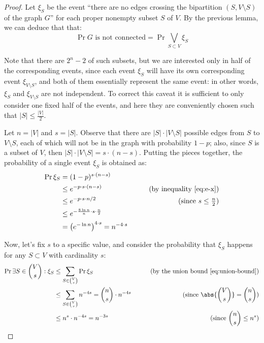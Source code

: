 \begin{proof}
    Let $\xi_S$ be the event ``there are no edges crossing the bipartition $(S, V \setminus S)$ of the graph $G$'' for each proper nonempty subset $S$ of $V$. By the previous lemma, we can deduce that that:
    \[
        \Pr{G \text{ is not connected}} = \Pr{\bigvee_{S \subset V} \xi_S}
    \]
    
    Note that there are $2^n - 2$ of such subsets, but we are interested only in half of the corresponding events, since each event $\xi_S$ will have its own corresponding event $\xi_{V \setminus S}$, and both of them essentially represent the same event: in other words,  $\xi_S$ and $\xi_{V \setminus S}$ are not independent. To correct this caveat it is sufficient to only consider one fixed half of the events, and here they are conveniently chosen such that $|S| \leq \frac{|V|}{2}$.
    
    Let $n = |V|$ and $s = |S|$. Observe that there are $|S| \cdot |V \setminus S|$ possible edges from $S$ to $V \setminus S$, each of which will not be in the graph with probability $1 - p$; also, since $S$ is a subset of $V$, then $|S| \cdot |V \setminus S| = s \cdot (n - s)$. Putting the pieces together, the probability of a single event $\xi_S$ is obtained as:
    \begin{align*}
        \Pr{\xi_S} &= (1 - p)^{s \cdot (n - s)}                   &                                  \\
        &\leq e^{-p \cdot s \cdot (n - s)}                        & \tag{by inequality \ref{eq:e-x}} \\
        &\leq e^{-p \cdot s \cdot n/2}                            & \tag{since $s \leq \frac{n}{2}$} \\
        &\leq e^{-\frac{8 \ln n}{n} \cdot s \cdot \frac{n}{2}}    &                                  \\
        &= \left(e^{-\ln n} \right)^{4 \cdot s} = n^{-4 \cdot s}  & 
    \end{align*}
    
    Now, let's fix $s$ to a specific value, and consider the probability that $\xi_S$ happens for any $S \subset V$ with cardinality $s$:
    \begin{align*}
        \Pr{\exists S \in \binom{V}{s} : \xi_S} &\leq \sum_{S \in \binom{V}{s}} \Pr{\xi_S} & \tag{by the union bound \ref{eq:union-bound}}               \\
        &\leq \sum_{S \in \binom{V}{s}} n^{-4s} = \binom{n}{s} \cdot n^{-4s}               & \tag{since $\displaystyle \abs{\binom{V}{s}} = \binom{n}{s}$} \\
        &\leq n^s \cdot n^{-4s} = n^{-3s}                                                  & \tag{since $\displaystyle \binom{n}{s} \leq n^s$}
    \end{align*}
    

\end{proof}
